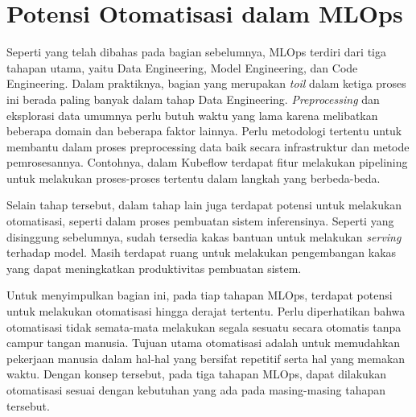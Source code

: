 \section{Potensi Otomatisasi dalam MLOps}

Seperti yang telah dibahas pada bagian sebelumnya, MLOps terdiri dari tiga tahapan utama, yaitu Data Engineering, Model Engineering, dan Code Engineering.
Dalam praktiknya, bagian yang merupakan \textit{toil} dalam ketiga proses ini berada paling banyak dalam tahap Data Engineering.
\textit{Preprocessing} dan eksplorasi data umumnya perlu butuh waktu yang lama karena melibatkan beberapa domain dan beberapa faktor lainnya.
Perlu metodologi tertentu untuk membantu dalam proses preprocessing data baik secara infrastruktur dan metode pemrosesannya.
Contohnya, dalam Kubeflow terdapat fitur melakukan pipelining untuk melakukan proses-proses tertentu dalam langkah yang berbeda-beda.

Selain tahap tersebut, dalam tahap lain juga terdapat potensi untuk melakukan otomatisasi, seperti dalam proses pembuatan sistem inferensinya.
Seperti yang disinggung sebelumnya, sudah tersedia kakas bantuan untuk melakukan \textit{serving} terhadap model.
Masih terdapat ruang untuk melakukan pengembangan kakas yang dapat meningkatkan produktivitas pembuatan sistem.

Untuk menyimpulkan bagian ini, pada tiap tahapan MLOps, terdapat potensi untuk melakukan otomatisasi hingga derajat tertentu.
Perlu diperhatikan bahwa otomatisasi tidak semata-mata melakukan segala sesuatu secara otomatis tanpa campur tangan manusia.
Tujuan utama otomatisasi adalah untuk memudahkan pekerjaan manusia dalam hal-hal yang bersifat repetitif serta hal yang memakan waktu.
Dengan konsep tersebut, pada tiga tahapan MLOps, dapat dilakukan otomatisasi sesuai dengan kebutuhan yang ada pada masing-masing tahapan tersebut.